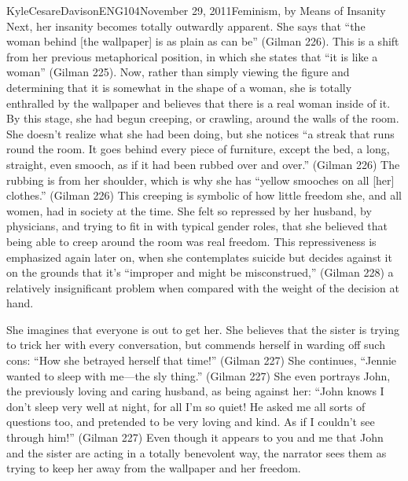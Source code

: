 \documentclass[11pt,letterpaper]{article}
\begin{document}
\begin{mla}{Kyle}{Cesare}{Davison}{ENG104}{November 29, 2011}{Feminism, by Means
of Insanity}
Next, her insanity becomes totally outwardly apparent.  She says that ``the
woman behind [the wallpaper] is as plain as can be'' (Gilman 226).  This is a
shift from her previous metaphorical position, in which she states that ``it is
like a woman'' (Gilman 225).  Now, rather than simply viewing the figure and
determining that it is somewhat in the shape of a woman, she is totally
enthralled by the wallpaper and believes that there is a real woman inside of
it.  By this stage, she had begun creeping, or crawling, around the walls of the
room.  She doesn't realize what she had been doing, but she notices ``a streak
that runs round the room.  It goes behind every piece of furniture, except the
bed, a long, straight, even smooch, as if it had been rubbed over and over.''
(Gilman 226)  The rubbing is from her shoulder, which is why she has ``yellow
smooches on all [her] clothes.'' (Gilman 226)  This creeping is symbolic of how
little freedom she, and all women, had in society at the time.  She felt so
repressed by her husband, by physicians, and trying to fit in with typical
gender roles, that she believed that being able to creep around the room was
real freedom.  This repressiveness is emphasized again later on, when she
contemplates suicide but decides against it on the grounds that it's ``improper
and might be misconstrued,'' (Gilman 228) a relatively insignificant problem
when compared with the weight of the decision at hand.

She imagines that everyone is out to get her.  She believes that the sister is
trying to trick her with every conversation, but commends herself in warding off
such cons: ``How she betrayed herself that time!'' (Gilman 227)  She continues,
``Jennie wanted to sleep with me---the sly thing.'' (Gilman 227)  She even
portrays John, the previously loving and caring husband, as being against her:
``John knows I don't sleep very well at night, for all I'm so quiet!  He asked
me all sorts of questions too, and pretended to be very loving and kind.  As if
I couldn't see through him!'' (Gilman 227)  Even though it appears to you and me
that John and the sister are acting in a totally benevolent way, the narrator
sees them as trying to keep her away from the wallpaper and her freedom.


\end{mla}
\end{document}
